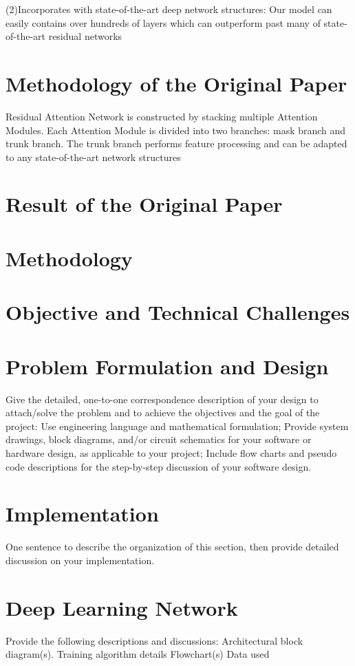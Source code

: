 \documentclass{article}
\begin{document}
\begin{multicols}{2}
(2)Incorporates with state-of-the-art deep network structures:
Our model can easily contains over hundreds of layers which can outperform past many of state-of-the-art residual networks


\section{Methodology of the Original Paper}
Residual Attention Network is constructed by stacking multiple Attention Modules. Each Attention Module is divided into two branches: mask branch and trunk branch. The trunk branch performs feature processing and can be adapted to any state-of-the-art network structures

\section{Result of the Original Paper}

\section{Methodology}

\section{Objective and Technical Challenges}


\section{Problem Formulation and Design}
Give the detailed, one-to-one correspondence description of your design to attach/solve the problem and to achieve the objectives and the goal of the project:
Use engineering language and mathematical formulation;
Provide system drawings, block diagrams, and/or circuit schematics for your software or hardware design, as applicable to your project; 
Include flow charts and pseudo code descriptions for the step-by-step discussion of your software design.


\section{Implementation}
One sentence to describe the organization of this section, then provide detailed discussion on your implementation. 

\section{Deep Learning Network}
 Provide the following descriptions and discussions: 
Architectural block diagram(s).  
Training algorithm details
Flowchart(s)
Data used



\end{multicols}
\end{document}
